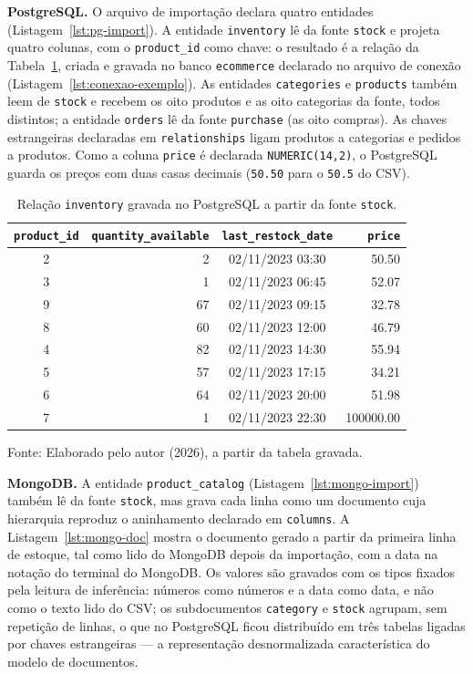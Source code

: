 \textbf{PostgreSQL.} O arquivo de importação declara quatro entidades
(Listagem~\ref{lst:pg-import}). A entidade \texttt{inventory} lê da fonte \texttt{stock} e
projeta quatro colunas, com o \texttt{product\_id} como chave: o resultado é a relação da
Tabela~\ref{tab:pg-inventory}, criada e gravada no banco \texttt{ecommerce} declarado
no arquivo de conexão (Listagem~\ref{lst:conexao-exemplo}). As entidades \texttt{categories} e
\texttt{products} também leem de \texttt{stock} e recebem os oito produtos e as oito
categorias da fonte, todos distintos; a entidade
\texttt{orders} lê da fonte \texttt{purchase} (as oito compras). As chaves estrangeiras
declaradas em \texttt{relationships} ligam produtos a categorias e pedidos a produtos. Como
a coluna \texttt{price} é declarada \texttt{NUMERIC(14,2)}, o PostgreSQL guarda os preços com
duas casas decimais (\texttt{50.50} para o \texttt{50.5} do CSV).

\begin{table}[H]
  \caption{Relação \texttt{inventory} gravada no PostgreSQL a partir da fonte \texttt{stock}.}
  \label{tab:pg-inventory}
  \centering
  \begin{tabular}{c r c r}
    \toprule
    \texttt{product\_id} & \texttt{quantity\_available} & \texttt{last\_restock\_date} & \texttt{price} \\
    \midrule
    2 &  2 & 02/11/2023 03:30 & 50.50 \\
    3 &  1 & 02/11/2023 06:45 & 52.07 \\
    9 & 67 & 02/11/2023 09:15 & 32.78 \\
    8 & 60 & 02/11/2023 12:00 & 46.79 \\
    4 & 82 & 02/11/2023 14:30 & 55.94 \\
    5 & 57 & 02/11/2023 17:15 & 34.21 \\
    6 & 64 & 02/11/2023 20:00 & 51.98 \\
    7 &  1 & 02/11/2023 22:30 & 100000.00 \\
    \bottomrule
  \end{tabular}
  \par\vspace{4pt}
  {\footnotesize Fonte: Elaborado pelo autor (2026), a partir da tabela gravada.}
\end{table}

\textbf{MongoDB.} A entidade \texttt{product\_catalog}
(Listagem~\ref{lst:mongo-import}) também lê da fonte \texttt{stock}, mas grava cada
linha como um documento cuja hierarquia reproduz o aninhamento declarado em
\texttt{columns}. A Listagem~\ref{lst:mongo-doc} mostra o documento gerado a partir da
primeira linha de estoque, tal como lido do MongoDB depois da importação, com a data na
notação do terminal do MongoDB. Os valores são gravados com os tipos fixados pela leitura de
inferência: números como números e a data como data, e não como o texto lido do CSV; os
subdocumentos
\texttt{category} e \texttt{stock} agrupam, sem repetição de linhas, o que no PostgreSQL
ficou distribuído em três tabelas ligadas por chaves estrangeiras --- a representação
desnormalizada característica do modelo de documentos.

